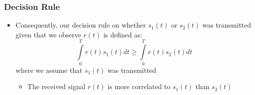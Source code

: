 \documentclass[10pt]{beamer}
\begin{document}
{
  \frametitle{Decision Rule}

    \begin{itemize}
        \item Consequently, our decision rule on whether $s_1(t)$ or $s_2(t)$ was transmitted given that we observe $r(t)$ is defined as:
        \begin{equation}
            {\int\limits_0^Tr(t)s_1(t)dt}\ge{\int\limits_0^Tr(t)s_2(t)dt}
        \end{equation}
        where we assume that $s_1(t)$ was transmitted
        \begin{itemize}
            \item The received signal $r(t)$ is more correlated to $s_1(t)$ than $s_2(t)$
        \end{itemize}
     \end{itemize}

}
\end{document}
